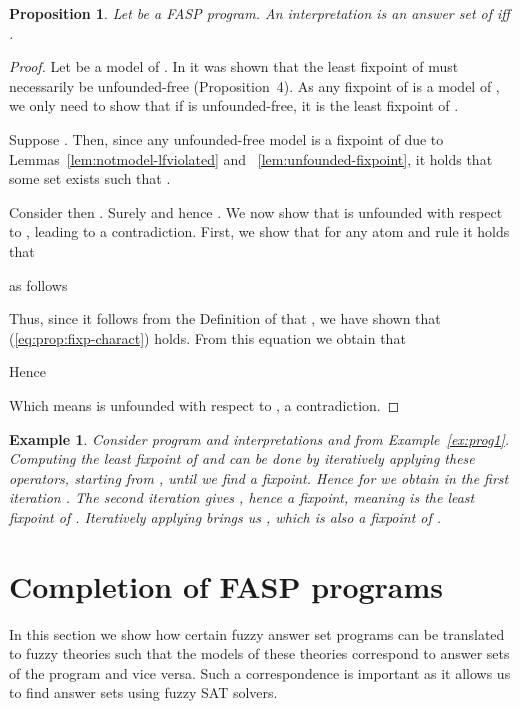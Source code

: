 \documentclass{tlp}
\newtheorem{example}{Example}
\newtheorem{proposition}{Proposition}
\begin{document}
\begin{proposition}\label{prop:fixp-charact}
 Let  be a FASP program. An interpretation  is an answer set of  iff .
\end{proposition}
\begin{proof}
 Let  be a model of .
 In \cite{FASP:amai} it was shown that the least fixpoint of  must necessarily be unfounded-free (Proposition~4). As any fixpoint of  is a model of , we only need to show that if  is unfounded-free, it is the least fixpoint of .
 
 Suppose . Then, since any unfounded-free model is a fixpoint of  due to Lemmas~\ref{lem:notmodel-lfviolated} and ~\ref{lem:unfounded-fixpoint}, it holds that some set  exists such that .
 
 Consider then . Surely  and hence . We now show that  is unfounded with respect to , leading to a contradiction. First, we show that for any atom  and rule  it holds that 
  
 as follows
  
\noindent Thus, since it follows from the Definition of  that , we have shown that (\ref{eq:prop:fixp-charact}) holds. From this equation we obtain that
  
 Hence
  
 Which means  is unfounded with respect to , a contradiction.
\end{proof}




\begin{example}
Consider program  and interpretations  and  from Example~\ref{ex:prog1}. Computing the least fixpoint of  and  can be done by iteratively applying these operators, starting from , until we find a fixpoint. Hence for  we obtain in the first iteration . The second iteration gives , hence a fixpoint, meaning  is the least fixpoint of .
Iteratively applying  brings us , which is also a fixpoint of .
\end{example}

\section{Completion of FASP programs}\label{sec:completion}

In this section we show how certain fuzzy answer set programs can be translated to fuzzy theories such that the models of these theories correspond to answer sets of the program and vice versa. Such a correspondence is important as it allows us to find answer sets using fuzzy SAT solvers.
\end{document}
